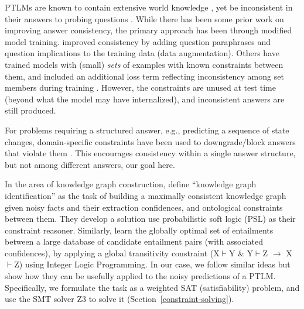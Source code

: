 \documentclass[11pt]{article}
\newcommand{\red}[1]{\textcolor{red}{#1}}
\begin{document}
PTLMs are known to contain extensive world knowledge \cite{Petroni2019LanguageMA, roberts-etal-2020-much},
yet be inconsistent in their answers to probing questions \cite{ettinger-2020-bert,davison-etal-2019-commonsense, Kassner2020NegatedAM, ravichander-etal-2020-systematicity, Elazar2021MeasuringAI}.
While there has been some prior work on improving answer consistency, the primary approach
has been through modified model training. \citet{Ribeiro2019AreRR} improved consistency
by adding question paraphrases and question implications to the training data (data augmentation).
Others have trained models with (small) {\it sets} of examples with known constraints
between them, and included an additional loss term reflecting inconsistency among
set members during training \cite{Minervini2018AdversariallyRN,Li2019ALF,Asai2020LogicGuidedDA}.
However, the constraints are unused at test time (beyond what the model may have
internalized), and inconsistent answers are still produced.

For problems requiring a structured answer, e.g., predicting a sequence of
state changes, domain-specific constraints have been used to downgrade/block
answers that violate them \cite{Tandon2018ReasoningAA,Du2019BeCI}. This
encourages consistency within a single answer structure, but not among
different answers, our goal here.

In the area of knowledge graph construction,
\citet{Pujara2013KnowledgeGI} define ``knowledge graph identification''
as the task of building a maximally consistent knowledge graph given noisy facts
and their extraction confidences, and ontological constraints between them.
They develop a solution use probabilistic soft logic (PSL) \cite{Broecheler2010ProbabilisticSL}
as their constraint reasoner. 
Similarly, \citet{berant2010global} learn the globally
optimal set of entailments between a large database of candidate
entailment pairs (with associated confidences), by applying
a global transitivity constraint (X$\vdash$Y \& Y$\vdash$Z $\rightarrow$ X$\vdash$Z)
using Integer Logic Programming. 
In our case, we follow similar ideas but show how they can be usefully applied to the noisy predictions of a PTLM.
Specifically, we formulate the task as a weighted SAT (satisfiability) problem, and use 
the SMT solver Z3 \cite{z3} to solve it (Section~\ref{constraint-solving}).
\end{document}
